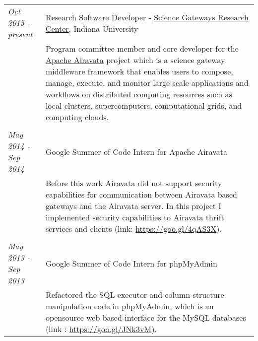 \documentclass[a4paper,10pt]{article}
\begin{document}
\begin{tabular}{p{3cm}|p{13.5cm}}

\emph{Oct 2015 - present}& Research Software Developer - \href{https://goo.gl/0YA9Ac}{Science Gateways Research Center}, Indiana University\\
&\footnotesize{Program committee member and core developer for the \href{https://goo.gl/s9Gm3k}{Apache Airavata} project which is a science gateway middleware framework that enables users to compose, manage, execute, and monitor large scale applications and workflows on distributed computing resources such as local clusters, supercomputers, computational grids, and computing clouds.}\\\\

\emph{May 2014 - Sep 2014}& Google Summer of Code Intern for Apache Airavata\\
&\footnotesize{Before this work Airavata did not support security capabilities for communication between Airavata based gateways and the Airavata server. In this project I implemented security capabilities to Airavata thrift services and clients (link: \url{https://goo.gl/4qAS3X}).}\\\\


\emph{May 2013 - Sep 2013} & Google Summer of Code Intern for phpMyAdmin 
\\&\footnotesize{Refactored the SQL executor and column structure manipulation code in phpMyAdmin, which is an opensource web based interface for the MySQL databases (link : \url{https://goo.gl/JNk3vM}).}
\end{tabular}


\end{document}
